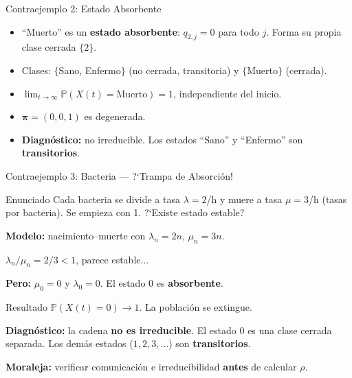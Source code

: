\documentclass[aspectratio=1610, 10pt]{beamer}
\newcommand{\Prob}{\mathbb{P}}
\newcommand{\bpi}{\boldsymbol{\pi}}
\begin{document}
\begin{frame}{Contraejemplo 2: Estado Absorbente}
  \begin{center}
  \end{center}

  \begin{itemize}
    \item ``Muerto'' es un \textbf{estado absorbente}: $q_{2,j}=0$ para todo $j$. Forma su propia clase cerrada $\{2\}$.
    \item Clases: $\{$Sano, Enfermo$\}$ (no cerrada, transitoria) y $\{$Muerto$\}$ (cerrada).
    \item $\lim_{t\to\infty} \Prob(X(t)=\text{Muerto}) = 1$, independiente del inicio.
    \item $\bpi = (0, 0, 1)$ es degenerada.
    \item \textbf{Diagn\'{o}stico:} no irreducible. Los estados ``Sano'' y ``Enfermo'' son \textbf{transitorios}.
  \end{itemize}
\end{frame}

\begin{frame}{Contraejemplo 3: Bacteria --- ?`Trampa de Absorci\'{o}n!}
  \begin{exampleblock}{Enunciado}
    \small
    Cada bacteria se divide a tasa $\lambda = 2$/h y muere a tasa $\mu = 3$/h
    (tasas por bacteria). Se empieza con 1. ?`Existe estado estable?
  \end{exampleblock}

  \textbf{Modelo:} nacimiento--muerte con $\lambda_n = 2n$, $\mu_n = 3n$.

  $\lambda_n / \mu_n = 2/3 < 1$, parece estable...

  \vspace{4pt}
  \textbf{Pero:} $\mu_0 = 0$ y $\lambda_0 = 0$. El estado $0$ es \textbf{absorbente}.

  \begin{alertblock}{Resultado}
    $\Prob(X(t)=0) \to 1$. La poblaci\'{o}n se extingue.

    \textbf{Diagn\'{o}stico:} la cadena \textbf{no es irreducible}. El estado 0 es una clase cerrada separada.
    Los dem\'{a}s estados ($1, 2, 3, \ldots$) son \textbf{transitorios}.

    \textbf{Moraleja:} verificar comunicaci\'{o}n e irreducibilidad \textbf{antes} de calcular $\rho$.
  \end{alertblock}
\end{frame}
\end{document}
